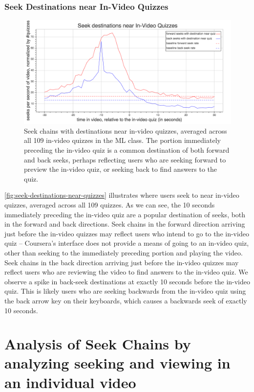 \documentclass{sigchi}
\begin{document}
\subsubsection{Seek Destinations near In-Video Quizzes}

\begin{figure}
\includegraphics[width=1.0\columnwidth]{seek-destinations-near-quizzes}
\caption{Seek chains with destinations near in-video quizzes, averaged across all 109 in-video quizzes in the ML class. The portion immediately preceding the in-video quiz is a common destination of both forward and back seeks, perhaps reflecting users who are seeking forward to preview the in-video quiz, or seeking back to find answers to the quiz.}
\label{fig:seek-destinations-near-quizzes}
\end{figure}

\autoref{fig:seek-destinations-near-quizzes} illustrates where users seek to near in-video quizzes, averaged across all 109 quizzes. As we can see, the 10 seconds immediately preceding the in-video quiz are a popular destination of seeks, both in the forward and back directions. Seek chains in the forward direction arriving just before the in-video quizzes may reflect users who intend to go to the in-video quiz -- Coursera's interface does not provide a means of going to an in-video quiz, other than seeking to the immediately preceding portion and playing the video. Seek chains in the back direction arriving just before the in-video quizzes may reflect users who are reviewing the video to find answers to the in-video quiz. We observe a spike in back-seek destinations at exactly 10 seconds before the in-video quiz. This is likely users who are seeking backwards from the in-video quiz using the back arrow key on their keyboards, which causes a backwards seek of exactly 10 seconds.

\section{Analysis of Seek Chains by analyzing seeking and viewing in an individual video}
\end{document}
